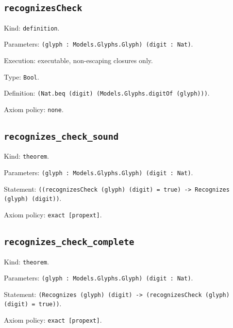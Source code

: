 \documentclass[11pt]{article}
\begin{document}
\subsection*{\texttt{recognizesCheck}}
\noindent Kind: \texttt{definition}.\par
\noindent Parameters: \texttt{(glyph : Models.Glyphs.Glyph) (digit : Nat)}.\par
\noindent Execution: executable, non-escaping closures only.\par
\noindent Type: \texttt{Bool}.\par
\noindent Definition: \texttt{(Nat.beq (digit) (Models.Glyphs.digitOf (glyph)))}.\par
\noindent Axiom policy: \texttt{none}.\par
\subsection*{\texttt{recognizes\_check\_sound}}
\noindent Kind: \texttt{theorem}.\par
\noindent Parameters: \texttt{(glyph : Models.Glyphs.Glyph) (digit : Nat)}.\par
\noindent Statement: \texttt{((recognizesCheck (glyph) (digit) = true) -> Recognizes (glyph) (digit))}.\par
\noindent Axiom policy: \texttt{exact [propext]}.\par
\subsection*{\texttt{recognizes\_check\_complete}}
\noindent Kind: \texttt{theorem}.\par
\noindent Parameters: \texttt{(glyph : Models.Glyphs.Glyph) (digit : Nat)}.\par
\noindent Statement: \texttt{(Recognizes (glyph) (digit) -> (recognizesCheck (glyph) (digit) = true))}.\par
\noindent Axiom policy: \texttt{exact [propext]}.\par
\end{document}
